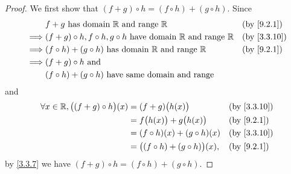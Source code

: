 \begin{proof}
  We first show that \((f + g) \circ h = (f \circ h) + (g \circ h)\).
  Since
  \begin{align*}
             & f + g \text{ has domain } \R \text{ and range } \R                                   &  & \text{(by \cref{9.2.1})}  \\
    \implies & (f + g) \circ h, f \circ h, g \circ h  \text{ have domain } \R \text{ and range } \R &  & \text{(by \cref{3.3.10})} \\
    \implies & (f \circ h) + (g \circ h)  \text{ has domain } \R \text{ and range } \R              &  & \text{(by \cref{9.2.1})}  \\
    \implies & (f + g) \circ h \text{ and }                                                                                        \\
             & (f \circ h) + (g \circ h) \text{ have same domain and range}
  \end{align*}
  and
  \begin{align*}
    \forall x \in \R, \big((f + g) \circ h\big)(x) & = (f + g)\big(h(x)\big)                   &  & \text{(by \cref{3.3.10})} \\
                                                   & = f\big(h(x)\big) + g\big(h(x)\big)       &  & \text{(by \cref{9.2.1})}  \\
                                                   & = (f \circ h)(x) + (g \circ h)(x)         &  & \text{(by \cref{3.3.10})} \\
                                                   & = \big((f \circ h) + (g \circ h)\big)(x), &  & \text{(by \cref{9.2.1})}
  \end{align*}
  by \cref{3.3.7} we have \((f + g) \circ h = (f \circ h) + (g \circ h)\).


\end{proof}
